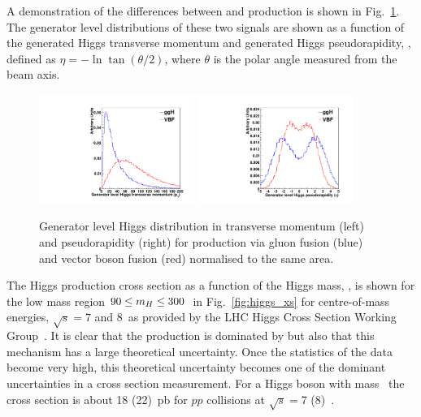 A demonstration of the differences between \ggH and \VBF production is shown in Fig.~\ref{fig:gen_level}. The generator level distributions of these two signals are shown as a function of the generated Higgs transverse momentum and generated Higgs pseudorapidity, \eta, defined as $\eta=-\ln\tan(\theta/2)$, where $\theta$ is the polar angle measured from the beam axis. 
\begin{figure}
  \includegraphics[width=0.45\textwidth]{theory/plots/genPT.pdf}
  \includegraphics[width=0.45\textwidth]{theory/plots/genEta.pdf}
  \caption[Generator level Higgs distributions]{Generator level Higgs distribution in transverse momentum (left) and pseudorapidity (right) for production via gluon fusion (blue) and vector boson fusion (red) normalised to the same area.}
  \label{fig:gen_level}
\end{figure}

The \SM Higgs production cross section as a function of the Higgs mass, \mH, is shown for the low mass region $90\leq m_{H}\leq 300$~\GeV in Fig.~\ref{fig:higgs_xs} for centre-of-mass energies, $\sqrt{s}=7$ and 8~\TeV as provided by the LHC Higgs Cross Section Working Group~\cite{LHCHiggsCrossSectionWorkingGroup3}. It is clear that the production is dominated by \ggH but also that this mechanism has a large theoretical uncertainty. Once the statistics of the \LHC data become very high, this theoretical uncertainty becomes one of the dominant uncertainties in a cross section measurement. For a \SM Higgs boson with mass ~\GeV the cross section is about 18 (22)~pb for $pp$ collisions at $\sqrt{s}=$7 (8)~\TeV.

